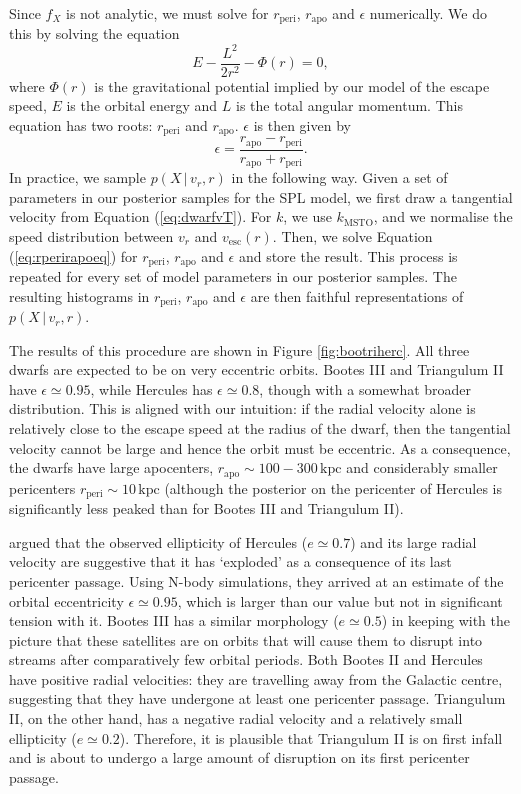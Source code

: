 \documentclass[useAMS,twocolumn,usenatbib]{mn2e}
\def\kpc{{\,\mathrm{kpc}}}
\def\vesc{{v_\mathrm{esc}}}
\def\rp{{r_\mathrm{peri}}}
\def\ra{{r_\mathrm{apo}}}
\def\ecc{{\epsilon}}
\begin{document}
Since $f_X$ is not analytic, we must solve for $\rp$, $\ra$ and $\ecc$ numerically. 
We do this by solving the equation 
%
\begin{equation}
E - \dfrac{L^2}{2r^2} - \Phi(r) = 0,
\label{eq:rperirapoeq}
\end{equation}
%
where $\Phi(r)$ is the gravitational potential implied by our model of the escape speed, $E$ is the orbital energy and $L$ is the total angular momentum.
This equation has two roots: $\rp$ and $\ra$. 
$\ecc$ is then given by
%
\begin{equation}
\ecc = \dfrac{\ra - \rp}{\ra + \rp}.
\end{equation}
%
In practice, we sample $p(X\,|\,v_r,r)$ in the following way. 
Given a set of parameters in our posterior samples for the SPL model, we first draw a tangential velocity from Equation (\ref{eq:dwarfvT}). 
For $k$, we use $k_\mathrm{MSTO}$, and we normalise the speed distribution between $v_r$ and $\vesc(r)$. 
Then, we solve Equation (\ref{eq:rperirapoeq}) for $\rp$, $\ra$ and $\ecc$ and store the result. 
This process is repeated for every set of model parameters in our posterior samples. 
The resulting histograms in $\rp$, $\ra$ and $\ecc$ are then faithful representations of $p(X\,|\,v_r,r)$.

The results of this procedure are shown in Figure \ref{fig:bootriherc}. 
All three dwarfs are expected to be on very eccentric orbits. 
Bootes III and Triangulum II have $\epsilon \simeq 0.95$, while Hercules has $\epsilon \simeq 0.8$, though with a somewhat broader distribution. 
This is aligned with our intuition: if the radial velocity alone is relatively close to the escape speed at the radius of the dwarf, then the tangential velocity cannot be large and hence the orbit must be eccentric. 
As a consequence, the dwarfs have large apocenters, $\ra \sim 100 - 300\kpc$ and considerably smaller pericenters $\rp \sim 10\kpc$ (although the posterior on the pericenter of Hercules is significantly less peaked than for Bootes III and Triangulum II).

\citet{Ku16} argued that the observed ellipticity of Hercules ($e \simeq 0.7$) and its large radial velocity are suggestive that it has `exploded' as a consequence of its last pericenter passage. 
Using N-body simulations, they arrived at an estimate of the orbital eccentricity $\ecc \simeq 0.95$, which is larger than our value but not in significant tension with it. 
Bootes III has a similar morphology ($e \simeq 0.5$) in keeping with the picture that these satellites are on orbits that will cause them to disrupt into streams after comparatively few orbital periods. 
Both Bootes II and Hercules have positive radial velocities: they are travelling away from the Galactic centre, suggesting that they have undergone at least one pericenter passage. 
Triangulum II, on the other hand, has a negative radial velocity and a relatively small ellipticity ($e \simeq 0.2$). 
Therefore, it is plausible that Triangulum II is on first infall and is about to undergo a large amount of disruption on its first pericenter passage.
\end{document}
